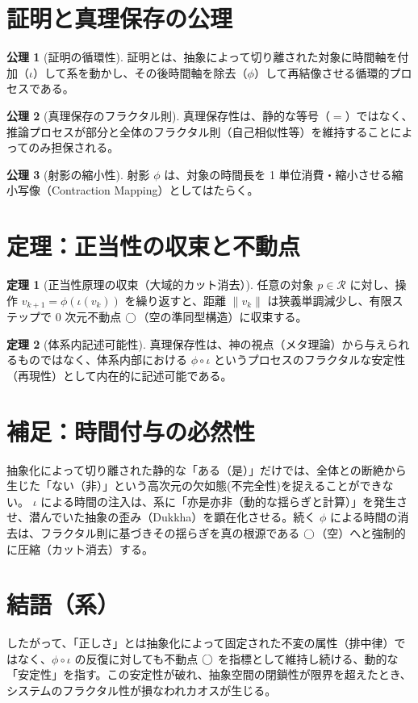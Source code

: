 \documentclass[11pt,a4paper]{article}
\theoremstyle{definition}
\newtheorem{axiom}{公理}[section]
\newtheorem{theorem}{定理}[section]
\newcommand{\Rep}{\mathcal{R}}   %
\begin{document}
\section{証明と真理保存の公理}

\begin{axiom}[証明の循環性]
証明とは、抽象によって切り離された対象に時間軸を付加（$\iota$）して系を動かし、その後時間軸を除去（$\phi$）して再結像させる循環的プロセスである。
\end{axiom}

\begin{axiom}[真理保存のフラクタル則]
真理保存性は、静的な等号（$=$）ではなく、推論プロセスが部分と全体のフラクタル則（自己相似性等）を維持することによってのみ担保される。
\end{axiom}

\begin{axiom}[射影の縮小性]
射影 $\phi$ は、対象の時間長を 1 単位消費・縮小させる縮小写像（Contraction Mapping）としてはたらく。
\end{axiom}

\section{定理：正当性の収束と不動点}

\begin{theorem}[正当性原理の収束（大域的カット消去）]
任意の対象 $p \in \Rep$ に対し、操作 $v_{k+1} = \phi(\iota(v_k))$ を繰り返すと、距離 $\|v_k\|$ は狭義単調減少し、有限ステップで $0$ 次元不動点 $\bigcirc$（空の準同型構造）に収束する。
\end{theorem}

\begin{theorem}[体系内記述可能性]
真理保存性は、神の視点（メタ理論）から与えられるものではなく、体系内部における $\phi \circ \iota$ というプロセスのフラクタルな安定性（再現性）として内在的に記述可能である。
\end{theorem}

\section{補足：時間付与の必然性}
抽象化によって切り離された静的な「ある（是）」だけでは、全体との断絶から生じた「ない（非）」という高次元の欠如態(不完全性)を捉えることができない。
$\iota$ による時間の注入は、系に「亦是亦非（動的な揺らぎと計算）」を発生させ、潜んでいた抽象の歪み（Dukkha）を顕在化させる。続く $\phi$ による時間の消去は、フラクタル則に基づきその揺らぎを真の根源である $\bigcirc$（空）へと強制的に圧縮（カット消去）する。

\section*{結語（系）}
したがって、「正しさ」とは抽象化によって固定された不変の属性（排中律）ではなく、$\phi \circ \iota$ の反復に対しても不動点 $\bigcirc$ を指標として維持し続ける、動的な「安定性」を指す。この安定性が破れ、抽象空間の閉鎖性が限界を超えたとき、システムのフラクタル性が損なわれカオスが生じる。
\end{document}
